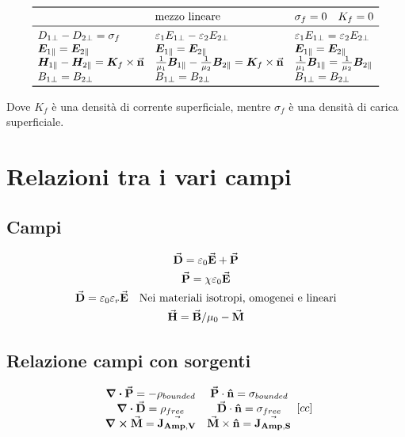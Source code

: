 \documentclass[a4paper]{scrarticle}
\begin{document}
\[
\begin{array}{lll}
    \toprule
    & \text{mezzo lineare} & \sigma_f = 0\quad K_f = 0\\
    \midrule
    D_{1\perp} - D_{2\perp} = \sigma_f & \varepsilon_1 E_{1\perp} - \varepsilon_2 E_{2\perp} & \varepsilon_1 E_{1\perp} = \varepsilon_2 E_{2\perp}\\
    \bm E_{1\parallel} = \bm E_{2\parallel} & \bm E_{1\parallel} = \bm E_{2\parallel} & \bm E_{1\parallel} = \bm E_{2\parallel} \\
    \bm H_{1\parallel} - \bm H_{2\parallel} = \bm K_f \times \va n  & \frac{1}{\mu_1}\bm B_{1\parallel} - \frac{1}{\mu_2}\bm B_{2\parallel} = \bm K_f \times \va n & \frac{1}{\mu_1}\bm B_{1\parallel} = \frac{1}{\mu_2}\bm B_{2\parallel} \\
    B_{1\perp} = B_{2\perp} & B_{1\perp} = B_{2\perp} & B_{1\perp} = B_{2\perp} \\
    \bottomrule
\end{array}   
\]

Dove $K_f$ è una densità di corrente superficiale, mentre $\sigma_f$ è una densità di carica superficiale.

\section{Relazioni tra i vari campi}

\subsection{Campi}

\begin{gather}
    \va D = \varepsilon_0 \va E + \va P\\
    \va P = \chi\varepsilon_0 \va E \\
    \va D = \varepsilon_0 \varepsilon_r \va E \quad \text{Nei materiali isotropi, omogenei e lineari}\\
    \va H = \va B/\mu_0 - \va M
\end{gather}

\subsection{Relazione campi con sorgenti}
\[
\begin{array}{cc}
    \div {\va P} = - \rho_{bounded} &
    \va P \cdot  \vu n = \sigma_{bounded}\\
    \div {\va D} = \rho_{free} &
    \va D \cdot  \vu n = \sigma_{free}\\
    \curl {\va M} = \va {J_{Amp, V}} &
    \va M \times \vu n = \va {J_{Amp, S}}
\end{array}[cc]
\]
\end{document}
